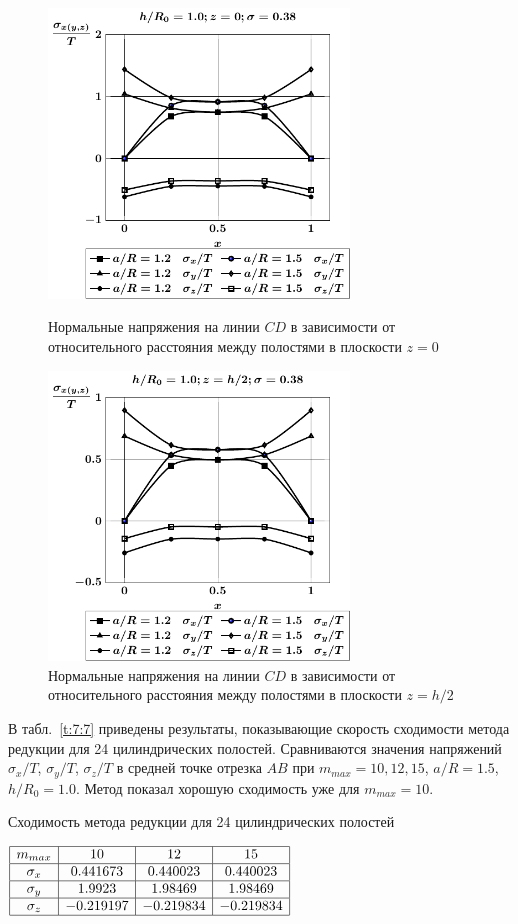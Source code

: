 \begin{figure}[h!]
\centering\footnotesize
\parbox[b]{7.5cm}{\centering\includegraphics[width=8cm]{cav24-a-h10-r10-z0-diag.pdf}
\caption{Нормальные напряжения на линии $CD$ в зависимости от относительного расстояния между полостями в плоскости $z=0$
\label{f:7:128}}}\hfil\hfil
\parbox[b]{7.5cm}{\centering\includegraphics[width=8cm]{cav24-a-h10-r10-z1-diag.pdf}
\caption{Нормальные напряжения на линии $CD$ в зависимости от относительного расстояния между полостями в плоскости $z=h/2$
\label{f:7:129}}}
\end{figure}

В табл.~\ref{t:7:7} приведены результаты, показывающие скорость сходимости метода редукции для 24 цилиндрических полостей. Сравниваются значения напряжений $\sigma_x/T$, $\sigma_y/T$, $\sigma_z/T$ в средней точке отрезка $AB$ при $m_{max}=10,12,15$, $a/R=1.5$, $h/R_0=1.0$. Метод показал хорошую сходимость уже для $m_{max}=10$.\par\sloppy

\begin{table}[h!]
\caption{Сходимость метода редукции для 24 цилиндрических полостей}
\centering
$
\begin{array}{|c|c|c|c|}
\hline
m_{max} & 10 & 12 & 15 \\
\hline
\sigma_x & 0.441673 & 0.440023 & 0.440023 \\
\hline
\sigma_y & 1.9923 & 1.98469 & 1.98469 \\
\hline
\sigma_z & -0.219197 & -0.219834 & -0.219834 \\
\hline
\end{array}
$
\label{t:7:7}
\end{table}

